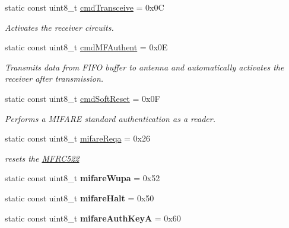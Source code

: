 \begin{DoxyCompactItemize}
static const uint8\+\_\+t \hyperlink{classMFRC522_afecac251dc4b33d217f9c606d1e72b6d}{cmd\+Transceive} = 0x0C
\begin{DoxyCompactList}\small\item\em Activates the receiver circuits. \end{DoxyCompactList}\item 
\mbox{\label{classMFRC522_afae620bc8a05c0dc01b87673ac2b2f02}} 
static const uint8\+\_\+t \hyperlink{classMFRC522_afae620bc8a05c0dc01b87673ac2b2f02}{cmd\+M\+F\+Authent} = 0x0E
\begin{DoxyCompactList}\small\item\em Transmits data from F\+I\+FO buffer to antenna and automatically activates the receiver after transmission. \end{DoxyCompactList}\item 
\mbox{\label{classMFRC522_ac17ff69d49cd5965d8f91bf8df93c39a}} 
static const uint8\+\_\+t \hyperlink{classMFRC522_ac17ff69d49cd5965d8f91bf8df93c39a}{cmd\+Soft\+Reset} = 0x0F
\begin{DoxyCompactList}\small\item\em Performs a M\+I\+F\+A\+RE standard authentication as a reader. \end{DoxyCompactList}\item 
static const uint8\+\_\+t \hyperlink{classMFRC522_a8e438d50133c5a2a106e9bdbdeeb19ec}{mifare\+Reqa} = 0x26
\begin{DoxyCompactList}\small\item\em resets the \hyperlink{classMFRC522}{M\+F\+R\+C522} \end{DoxyCompactList}\item 
\mbox{\label{classMFRC522_a14b20b90165d697b464cc8fbcabdd472}} 
static const uint8\+\_\+t {\bfseries mifare\+Wupa} = 0x52
\item 
\mbox{\label{classMFRC522_af5419000d91fe4b40d7d7539c0221ac4}} 
static const uint8\+\_\+t {\bfseries mifare\+Halt} = 0x50
\item 
\mbox{\label{classMFRC522_a54e44da7a00e2c1ef5bd51d1e00200f0}} 
static const uint8\+\_\+t {\bfseries mifare\+Auth\+KeyA} = 0x60
\item 
\mbox{\label{classMFRC522_a23d0083f34efe15fd2c91137cad39cbc}} 

\end{DoxyCompactItemize}

